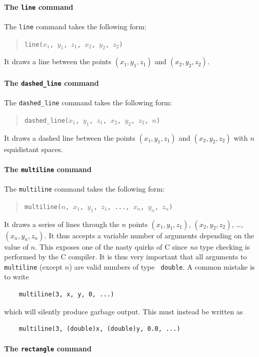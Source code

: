 \paragraph{The \texttt{line} command}

The \texttt{line} command takes the following form:
\begin{quote}
  \texttt{line($x_1$, $y_1$, $z_1$, $x_2$, $y_2$, $z_2$)}
\end{quote}
It draws a line between the points $(x_1, y_1, z_1)$ and $(x_2, y_2,
z_2)$.

\paragraph{The \texttt{dashed\_line} command}

The \texttt{dashed\_line} command takes the following form:
\begin{quote}
  \texttt{dashed\_line($x_1$, $y_1$, $z_1$, $x_2$, $y_2$, $z_2$, $n$)}
\end{quote}
It draws a dashed line between the points $(x_1, y_1, z_1)$ and $(x_2, y_2,
z_2)$ with $n$ equidistant spaces.


\paragraph{The \texttt{multiline} command}

The \texttt{multiline} command takes the following form:
\begin{quote}
  \texttt{multiline($n$, $x_1$, $y_1$, $z_1$, ..., $x_n$, $y_n$, $z_n$)}
\end{quote}
It draws a series of lines through the $n$ points $(x_1, y_1, z_1)$,
$(x_2, y_2, z_2)$, \ldots, $(x_n, y_n, z_n)$. It thus accepts a variable
number of arguments depending on the value of $n$. This exposes
one of the nasty quirks of C since \emph{no} type checking is
performed by the C compiler. It is thus very important that all
arguments to \texttt{multiline} (except $n$) are valid numbers of type \texttt{
  double}. A common mistake is to write
\begin{verbatim}
    multiline(3, x, y, 0, ...)
\end{verbatim}
which will silently produce garbage output. This must instead be
written as
\begin{verbatim}
    multiline(3, (double)x, (double)y, 0.0, ...)
\end{verbatim}

\paragraph{The \texttt{rectangle} command}

